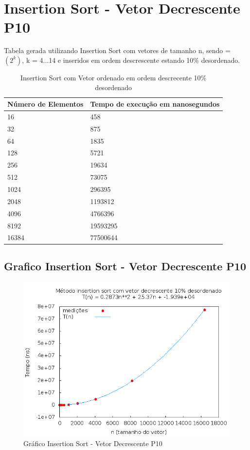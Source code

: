 \documentclass[12pt,a4paper,twoside]{report}
\begin{document}
\section{Insertion Sort - Vetor Decrescente P10}
Tabela gerada utilizando Insertion Sort com vetores de tamanho n, sendo = $(2^k)$, k = 4...14 e inseridos em ordem descrescente estando 10\% desordenado.

\begin{table}[H]
\centering
\caption{Insertion Sort com Vetor ordenado em ordem descrecente 10\% desordenado}
\label{my-label}
\begin{tabular}{|l|l|}
\hline
\multicolumn{1}{|c|}{\textbf{Número de Elementos}} & \multicolumn{1}{c|}{\textbf{Tempo de execução em nanosegundos}} \\ \hline
16 & 458 \\ \hline
32 & 875 \\ \hline
64 & 1835 \\ \hline
128 & 5721 \\ \hline
256 & 19634 \\ \hline
512 & 73075 \\ \hline
1024 & 296395 \\ \hline
2048 & 1193812 \\ \hline
4096 & 4766396 \\ \hline
8192 & 19593295 \\ \hline
16384 & 77500644 \\ \hline
\end{tabular}
\end{table}

\subsection{Grafico Insertion Sort - Vetor Decrescente P10}
\begin{figure}[H]
    \centering
    \includegraphics[width=0.7\linewidth]{graficos/Insertion/vIntDecrescenteP10/vIntDecrescenteP10.png}
  \caption{Gráfico Insertion Sort - Vetor Decrescente P10}
\end{figure}
\end{document}
